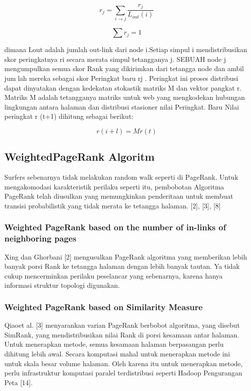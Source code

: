 \documentclass[conference]{IEEEtran}
\begin{document}
\begin{equation}
    r_j = \sum_{i \rightarrow j} \frac{r_j}{L_{out}(i)}
\end{equation}

\begin{equation}
    \sum r_j = 1
\end{equation}

dimana Lout adalah jumlah out-link dari node i.Setiap
simpul i mendistribusikan skor peringkatnya ri secara merata
simpul tetangganya j. SEBUAH node j mengumpulkan semua
skor Rank yang dikirimkan dari tetangga node dan ambil jumlah mereka sebagai skor Peringkat baru rj . Peringkat ini proses
distribusi dapat dinyatakan dengan kedekatan stokastik matriks
M dan vektor pangkat r. Matriks M adalah tetangganya
matriks untuk web yang mengkodekan hubungan lingkungan
antara halaman dan distribusi stasioner nilai Peringkat. Baru
Nilai peringkat r
(t+1) dihitung sebagai berikut:

\begin{equation}
    r(i+l)=Mr(t)
\end{equation}
\subsection{WeightedPageRank Algoritm}
Surfers sebenarnya tidak melakukan random walk seperti
di PageRank. Untuk mengakomodasi karakteristik perilaku
seperti itu, pembobotan Algoritma PageRank telah diusulkan
yang memungkinkan penderitaan untuk membuat transisi
probabilistik yang tidak merata ke tetangga halaman. [2], [3],
[8]


\subsubsection{ Weighted  PageRank  based  on  the  number  of  in-links  of  neighboring pages}
Xing dan Ghorbani [2] mengusulkan PageRank algoritma
yang memberikan lebih banyak porsi Rank ke tetangga
halaman dengan lebih banyak tautan. Ya tidak cukup
mencerminkan perilaku peselancar yang sebenarnya, karena
hanya informasi struktur topologi digunakan.

\subsubsection{Weighted PageRank based on Similarity Measure}
Qiaoet al. [3] menyarankan varian PageRank berbobot
algoritma, yang disebut SimRank, yang mendistribusikan nilai
Rank di porsi kesamaan antar halaman. Untuk menerapkan
metode, semua kesamaan halaman berpasangan perlu dihitung
lebih awal. Secara komputasi mahal untuk menerapkan
metode ini untuk skala besar volume halaman. Oleh karena
itu untuk menerapkan metode, perlu infrastruktur komputasi
paralel terdistribusi seperti Hadoop Pengurangan Peta [14].
\end{document}
